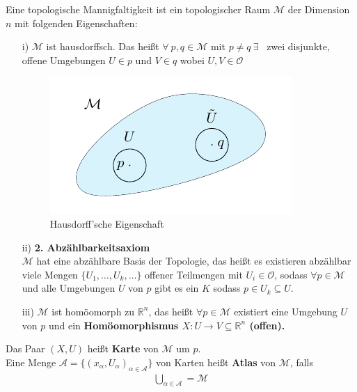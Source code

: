 \begin{defs}
Eine topologische Mannigfaltigkeit ist ein topologischer Raum $\mathcal{M}$ der Dimension $n$ mit folgenden Eigenschaften:
\begin{enumerate}
	\item[i)] $\mathcal{M}$ ist hausdorffsch. Das heißt $\forall \ p, q \in \mathcal{M}$ mit $p \neq q \  \exists$ \ zwei disjunkte, offene Umgebungen $U \in p$ und $V \in q$ wobei $U, V \in \mathcal{O}$
\begin{figure}[H]
\centering
\includegraphics[width=0.4\linewidth]{figures/tikz/hausdorff.pdf}
\caption{Hausdorff'sche Eigenschaft}
\label{img:hausdorff}
\end{figure} 	
	\item[ii)] \textbf{2. Abzählbarkeitsaxiom}  \\
	$\mathcal{M}$ hat eine abzählbare Basis der Topologie, das heißt es existieren abzählbar viele Mengen $\{U_1, \dots, U_k, \dots\}$ offener Teilmengen mit $U_i \in \mathcal{O}$, sodass $\forall p \in \mathcal{M}$ und alle Umgebungen $U$ von $p$ gibt es ein $K$ sodass $p \in U_k \subseteq U$.
	\item [iii)] $\mathcal{M}$ ist homöomorph zu $\mathbb{R}^n$, das heißt $\forall p \in \mathcal{M}$ existiert eine Umgebung $U$ von $p$ und ein \bfseries Homöomorphismus \normalfont $X: U \rightarrow V \subseteq \mathbb{R}^n$ (offen).
\end{enumerate} 
\end{defs}
\begin{minipage}[H]{.8\textwidth}
\begin{defs}
	Das Paar $(X, U)$ heißt \textbf{Karte} von $\mathcal{M}$ um $p$. \\
	Eine Menge $\mathcal{A} = \{(x_{\alpha},U_{\alpha})_{\alpha \in \mathcal{A}}\}$ von Karten heißt \textbf{Atlas} von $\mathcal{M}$, falls \\
	\begin{align}
	\bigcup\limits_{\alpha \in \mathcal{A}} = \mathcal{M}
	\end{align}
\end{defs}
\end{minipage}
\hspace{1cm}
